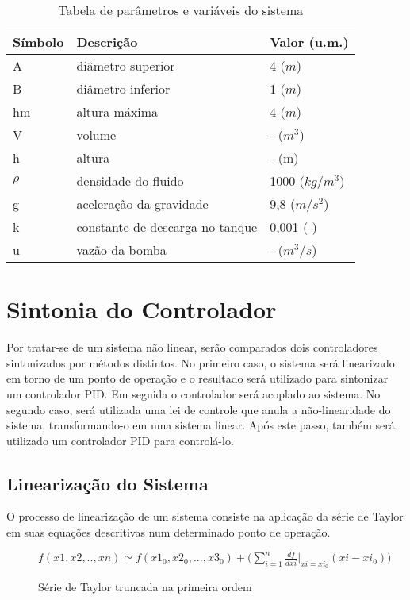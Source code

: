 \begin{table}[H]
	\centering
	\begin{tabular} {|m{5em}|m{15em}|m{8em}|}
		\hline
		Símbolo & Descrição & Valor (u.m.) \\
		\hline
		A & diâmetro superior & 4 ($m$) \\
		B & diâmetro inferior & 1 ($m$) \\
		hm & altura máxima & 4 ($m$) \\
		V & volume & - ($m^3$) \\
		h & altura & - (m) \\
		$\rho$ & densidade do fluido & 1000 ($kg/m^3$) \\
		g & aceleração da gravidade & 9,8 ($m/s^2$) \\
		k & constante de descarga no tanque & 0,001 (-)\\
		u & vazão da bomba & - ($m^3/s$)\\
		\hline
	\end{tabular}
	\caption{Tabela de parâmetros e variáveis do sistema}
	\label{tbl_parameters}
\end{table}

\section{Sintonia do Controlador}

Por tratar-se de um sistema não linear, serão comparados dois controladores sintonizados por métodos distintos. No primeiro caso, o sistema será linearizado em torno de um ponto de operação e o resultado será utilizado para sintonizar um controlador PID. Em seguida o controlador será acoplado ao sistema. No segundo caso, será utilizada uma lei de controle que anula a não-linearidade do sistema, transformando-o em uma sistema linear. Após este passo, também será utilizado um controlador PID para controlá-lo.

\subsection{Linearização do Sistema}

O processo de linearização de um sistema consiste na aplicação da série de Taylor em suas equações descritivas num determinado ponto de operação.

\begin{figure}[H]
	\centering
	$
	f(x1, x2, .. , xn) \simeq f(x1_0, x2_0, ..., x3_0) + \bigg( \sum_{i=1}^n \frac{df}{dxi}\big|_{xi=xi_0} (xi - xi_0) \bigg)
	$
	\caption{Série de Taylor truncada na primeira ordem}
\end{figure}

